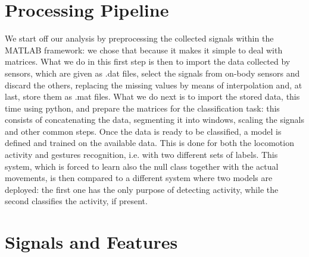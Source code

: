 
\section{Processing Pipeline}
\label{sec:processing_architecture}



We start off our analysis by preprocessing the collected signals within the MATLAB framework: we chose that because it makes it simple to deal with matrices. What we do in this first step is then to import the data collected by sensors, which are given as .dat files, select the signals from on-body sensors and discard the others, replacing the missing values by means of interpolation and, at last, store them as .mat files.
What we do next is to import the stored data, this time using python, and prepare the matrices for the classification task: this consists of concatenating the data, segmenting it into windows, scaling the signals and other common steps.
Once the data is ready to be classified, a model is defined and trained on the available data. This is done for both the locomotion activity and gestures recognition, i.e. with two different sets of labels. This system, which is forced to learn also the null class together with the actual movements, is then compared to a different system where two models are deployed: the first one has the only purpose of detecting activity, while the second classifies the activity, if present.

\section{Signals and Features}
\label{sec:model}


